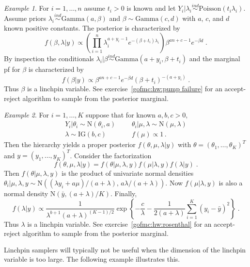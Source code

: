 \documentclass[12pt]{article}
\theoremstyle{plain}
\theoremstyle{definition}
\theoremstyle{remark}
\newtheorem{example}{Example}[section]
\begin{document}
\begin{example}
\label{gofmc:ex:pump failure}
For $i=1, \ldots, n$ assume $t_i > 0$ is known and let
$Y_{i} | \lambda_i \stackrel{ind}{\sim} \text{Poisson}(t_i
\lambda_i)$.  Assume priors
$\lambda_i \stackrel{ind}{\sim} \text{Gamma}(a, \beta)$ and
$\beta \sim \text{Gamma}(c, d)$ with $a$, $c$, and $d$ known positive
constants. The posterior is characterized by
$$
f(\beta, \lambda |y) \propto \left( \prod_{i=1}^{n} \lambda_{i}^{a +
    y_i - 1} e^{-(\beta+ t_i)\lambda_i}\right) \beta^{an+c-1}
e^{-\beta d} \; .
$$
By inspection the conditionals
$\lambda_i | \beta \stackrel{ind}{\sim} \text{Gamma}(a+y_i, \beta +
t_i)$ and the marginal pf for $\beta$ is characterized by
$$
f(\beta | y) \propto \beta^{an+c-1} e^{-\beta d} \left( \beta + t_i
\right)^{-(a+y_i)} \; .
$$
Thus $\beta$ is a linchpin variable. See exercise~\ref{gofmc:hw:pump
  failure} for an accept-reject algorithm to sample from the posterior
marginal.
\end{example}

\begin{example} \label{gofmc:ex:rosenthal}
For $i=1,\ldots, K$ suppose that for known $a, b, c > 0$,
\begin{align*}
Y_i | \theta_i  \sim  \text{N}(\theta_i, a) ~~&~~~~~ \theta_i | \mu, \lambda \sim  \text{N}(\mu, \lambda)\\
\lambda  \sim \text{IG}(b, c) ~~&~~~~~  f(\mu)  \propto 1 \, .
\end{align*}
Then the hierarchy yields a proper posterior $f(\theta, \mu, \lambda |
y)$ with $\theta=(\theta_1, \ldots, \theta_K)^T$ and $y=(y_1, \ldots,
y_K)^T$.  Consider the factorization \cite[see][]{jone:hara:caff:neat:2006} 
$$
f(\theta, \mu, \lambda | y) = f(\theta | \mu, \lambda, y) f(\mu |
\lambda, y) f(\lambda |y) \; . 
$$
Then $f(\theta | \mu, \lambda, y)$ is the product of univariate normal
densities $\theta_i | \mu, \lambda, y \sim \text{N}((\lambda y_i +
a\mu)/(a+\lambda), \, a\lambda / (a + \lambda))$.  Now $f(\mu |
\lambda, y)$ is also a normal density $\text{N}(\bar{y},
(a+\lambda)/K)$. Finally, 
$$
f(\lambda | y) \propto \frac{1}{\lambda^{b+1} (a + \lambda)^{(K-1)/2}}
\exp\left\{ - \frac{c}{\lambda} - \frac{1}{2(a+\lambda)}
  \sum_{i=1}^{K} (y_i - \bar{y})^{2}\right\} \; . 
$$
Thus $\lambda$ is a linchpin variable. See
exercise~\ref{gofmc:hw:rosenthal} for an accept-reject algorithm to
sample from the posterior marginal.   
\end{example}

Linchpin samplers will typically not be useful when the dimension of
the linchpin variable is too large.  The following example illustrates
this.
\end{document}

